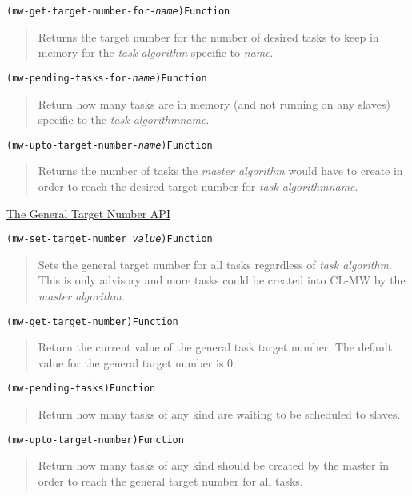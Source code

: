 \documentclass[titlepage,12pt]{book}
\newcommand{\phlabel}[1]{\phantomsection\label{#1}}
\newcommand{\xsmall}{\latexhtml{\small}{}}
\newcommand{\xnormalsize}{\latexhtml{\normalsize}{}}
\newcommand{\clmw}{\xsmall\textsc{CL-MW}\xnormalsize\xspace}
\newcommand{\ma}{\textit{master algorithm}\xspace}
\newcommand{\ta}{\textit{task algorithm}\xspace}
\newcommand{\apiheader}[1]{\begin{center}\underline{#1}\end{center}}
\newcommand{\apifunc}[2]{\noindent\xsmall\texttt{(#1)}\hspace*{\fill}\xnormalsize\texttt{#2}}
\newenvironment{apientry}[2]
	{\apifunc{#1}{#2}\begin{quotation}}
	{\end{quotation}}
\begin{document}
\begin{apientry}
{mw-get-target-number-for-\textit{name}}
{Function}
Returns the target number for the number of desired tasks to
keep in memory for the \ta specific to \emph{name}.
\end{apientry}

\begin{apientry}
{mw-pending-tasks-for-\textit{name}}
{Function}
Return how many tasks are in memory (and not running on any slaves) specific
to the \ta \emph{name}.
\end{apientry}

\begin{apientry}
{mw-upto-target-number-\textit{name}}
{Function}
Returns the number of tasks the \ma would have to create in order
to reach the desired target number for \ta \emph{name}.
\end{apientry}

\apiheader{\phlabel{general-target-number-api}The General Target Number API}
\begin{apientry}
{mw-set-target-number \emph{value}}
{Function}
Sets the general target number for all tasks regardless of \ta. This is
only advisory and more tasks could be created into \clmw by the \ma.
\end{apientry}

\begin{apientry}
{mw-get-target-number}
{Function}
Return the current value of the general task target number. The
default value for the general target number is 0.
\end{apientry}

\begin{apientry}
{mw-pending-tasks}
{Function}
Return how many tasks of any kind are waiting to be scheduled to slaves.
\end{apientry}

\begin{apientry}
{mw-upto-target-number}
{Function}
Return how many tasks of any kind should be created by the master in order
to reach the general target number for all tasks.
\end{apientry}
\end{document}
